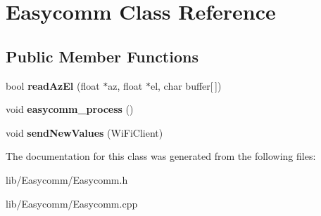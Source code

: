 \hypertarget{class_easycomm}{}\section{Easycomm Class Reference}
\label{class_easycomm}
\subsection*{Public Member Functions}
\begin{DoxyCompactItemize}
\item 
\mbox{\label{class_easycomm_a66e13b82095b8df9edf30e1509085e35}} 
bool {\bfseries read\+Az\+El} (float $\ast$az, float $\ast$el, char buffer\mbox{[}$\,$\mbox{]})
\item 
\mbox{\label{class_easycomm_a3169f5a1f4f812404d8ddf0bb61ad1af}} 
void {\bfseries easycomm\+\_\+process} ()
\item 
\mbox{\label{class_easycomm_a4b0870f8d0a86ebe4a3c948899017fcf}} 
void {\bfseries send\+New\+Values} (Wi\+Fi\+Client)
\end{DoxyCompactItemize}


The documentation for this class was generated from the following files\+:\begin{DoxyCompactItemize}
\item 
lib/\+Easycomm/Easycomm.\+h\item 
lib/\+Easycomm/Easycomm.\+cpp\end{DoxyCompactItemize}
